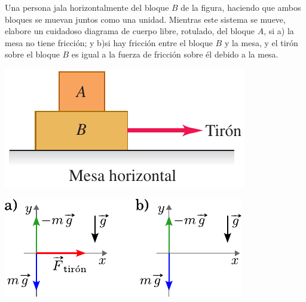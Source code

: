 \documentclass[11pt]{article}
\begin{document}
\begin{multicols}{2}
\begin{exercise}
Una persona jala horizontalmente del bloque $B$ de la figura, haciendo que ambos bloques se muevan juntos como una unidad. Mientras este sistema se mueve, elabore un cuidadoso diagrama de cuerpo libre, rotulado, del bloque $A$, si a) la mesa no tiene fricción; y b)si  hay fricción entre el bloque $B$ y la mesa, y el tirón sobre el bloque $B$ es igual a la fuerza de fricción sobre él debido a la mesa.
\begin{center}
    \includegraphics[scale=0.45]{figs/prob-04.png}
\end{center}
\end{exercise}
\begin{solution}
    \begin{center}
        \includegraphics[scale=1.0]{figs/prob-05.pdf}
    \end{center}
\end{solution}
\end{multicols}
\end{document}
